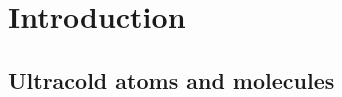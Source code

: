 
\chapter{Introduction}
\label{ch:Introduction}

\section{Ultracold atoms and molecules}
\label{sec:ultracold}